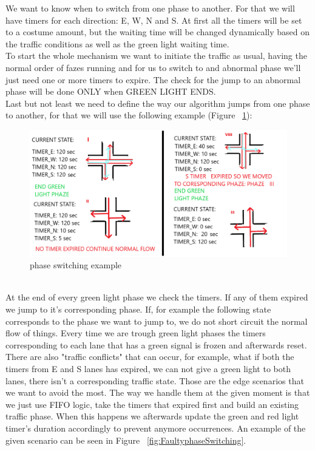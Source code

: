 \documentclass[17pt]{report}
\begin{document}
\indent \indent
We want to know when to switch from one phase to another. For that we will have
timers for each direction: E, W, N and S. At first all the timers will be set to 
a costume amount, but the waiting time will be changed dynamically based on the 
traffic conditions as well as the green light waiting time.\\
\indent \indent
To start the whole mechanism we want to initiate the traffic as usual, 
having the normal order of fazes running and for us to switch to and abnormal 
phase we'll just need one or more timers to expire. The check for the jump to an abnormal phase
will be done ONLY when GREEN LIGHT ENDS.\\
\indent \indent
Last but not least we need to define the way our algorithm jumps from one phase to 
another, for that we will use the following example
(Figure ~\ref{fig:phasesSwitchingExample}):
\begin{figure}[h!]
    \includegraphics[width=\textwidth]{Sketches/SwitchingTroughphasesExample.png}
    \caption{phase switching example}
    \label{fig:phasesSwitchingExample}
\end{figure}
\\
\indent \indent
At the end of every green light phase we check the timers. If any of 
them expired we jump to it's corresponding phase. If, for example the following state
corresponds to the phase we want to jump to, we do not short circuit the normal flow of
things. Every time we are trough green light phases the timers corresponding to 
each lane that has a green signal is frozen and afterwards reset.\\
\indent \indent
There are also "traffic conflicts" that can occur, for example, what if 
both the timers from E and S lanes has expired, we can not give a green light 
to both lanes, there isn't a corresponding traffic state. Those are the edge 
scenarios that we want to avoid the most. The way we handle them at the given moment is 
that we just use FIFO logic, take the timers that expired first and build an existing traffic 
phase. When this happens we afterwards update the green and red light timer's 
duration accordingly to prevent anymore occurrences. An example of the given 
scenario can be seen in Figure ~\ref{fig:FaultyphaseSwitching}. 
\end{document}
